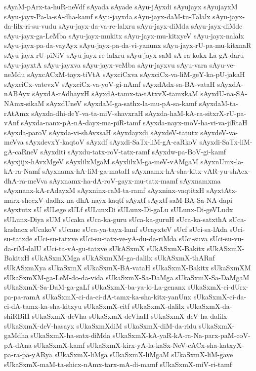 {sAyaM-pArx-ta-huR-neVdf
sAyada
sAyade
sAyu-jAyxdi
sAyujayx
sAyujayxM
sAyu-jayx-Pa-la-sA-dha-kamf
sAyu-jayxda
sAyu-jayx-daM-tu-Talalx
sAyu-jayx-da-lilx-ri-su-vudu
sAyu-jayx-da-va-re-lalxru
sAyu-jayx-diMda
sAyu-jayx-diMde
sAyu-jayx-ga-LeMba
sAyu-jayx-mukitx
sAyu-jayx-mu-kitxyeV
sAyu-jayx-nalalx
sAyu-jayx-pa-da-vayAyx
sAyu-jayx-pa-da-vi-yanunx
sAyu-jayx-rU-pa-mu-kitxnaR
sAyu-jayx-rU-piNiV
sAyu-jayx-re-lalxru
sAyu-jayx-saM-sA-ra-kokx-La-gA-daru
sAyu-jayxtA
sAyu-jayxva
sAyu-jayx-veMba
sAyu-jayxvu
sAyu-vara
sAyu-ve-neMdu
sAyxcACxM-tayx-tiVtA
sAyxciCxva
sAyxciCx-va-liM-geY-ka-pU-jakaH
sAyxciCx-vatevxV
sAyxciCx-va-yoV-gi-nAmf
sAyxdAdx-sa-BA-vataH
sAyxdA-nABAyx
sAyxdA-rAdhayxH
sAyxdA-tamx-ta-tAtxvX-tamxkaM
sAyxdU-na-SA-NAmx-sikaM
sAyxdUneV
sAyxdaM-ga-sathx-la-mu-pA-sa-kamf
sAyxdaM-ta-rAtAmx
sAyxda-dhi-deY-va-ta-miV-shavxraH
sAyxda-haM-kA-ra-sitxrX-rU-pa-vAnf
sAyxda-nanx-pA-nA-dayx-ma-piR-tamf
sAyxda-nayx-moV-ha-vi-va-jiRtaH
sAyxda-paroV
sAyxda-vi-shAvxsaH
sAyxdayxdi
sAyxdeV-tatutx
sAyxdeV-va-meVva
sAyxdevxY-kaqtoV
sAyxdf
sAyxdi-SaTx-liM-gA-caRkoV
sAyxdi-SaTx-liM-gA-caRneV
sAyxditi
sAyxdu-tatx-roV-tatx-ramf
sAyxdw-pa-BoV-gi-kamf
sAyxjijx-hAvxMgeV
sAyxlilxMgaM
sAyxlilxM-ga-meV-vAMgaM
sAyxnUmx-la-kA-ra-Namf
sAyxnamx-hA-liM-ga-mataH
sAyxnamx-hA-sha-kitx-vAR-yu-shAcx-dhA-ra-meVva
sAyxnamx-ha-dA-roV-gayx-mu-tatx-mamf
sAyxnamxma
sAyxnanx-kA-rAdayxM
sAyxninx-raM-ta-ramf
sAyxninx-vaqtitxH
sAyxtAtx-marx-shecxV-dadhx-na-dhA-nayx-kaqtf
sAyxtf
sAyxtf-saM-BA-Sa-NA-dapi
sAyxtutx
sU
sULege
sULf
sULunxDi
sULunx-Di-gaLu
sULunx-Di-geVLudx
sULunx-Diya
sUM
sUcaka
sUca-ka-guru
sUca-ka-guruH
sUca-ka-satxthA
sUca-kashacx
sUcakoV
sUcane
sUca-ya-tayx-lamf
sUcayxteV
sUcf
sUci-sa-lAda
sUci-su-tatxde
sUci-su-tatxve
sUci-su-tatx-ve-yA-du-da-riMda
sUci-suva
sUci-su-vu-da-riM-dalU
sUci-ta-vA-gu-tatxve
sUkASxmX
sUkASxmX-Bakitx
sUkASxmX-BakitxH
sUkASxmXMga
sUkASxmXM-ga-dalilx
sUkASxmX-thARnf
sUkASxmXya
sUkaSxmX
sUkaSxmX-BA-vataH
sUkaSxmX-Bakitx
sUkaSxmXM
sUkaSxmXM-ga-LeM-do-da-vida
sUkaSxmX-Sa-DaMga
sUkaSxmX-Sa-DaMgaM
sUkaSxmX-Sa-DaM-ga-gaLf
sUkaSxmX-ba-ya-lo-La-genanx
sUkaSxmX-ci-dUrx-pa-pa-ramA
sUkaSxmX-ci-da-ci-dA-tamx-ka-sha-kitx-yanUnx
sUkaSxmX-ci-da-ci-dA-tamx-ka-sha-kitxyu
sUkaSxmX-citf
sUkaSxmX-dalilx
sUkaSxmX-da-shiRBiH
sUkaSxmX-deVha
sUkaSxmX-deVhaH
sUkaSxmX-deV-ha-dalilx
sUkaSxmX-deV-hasayx
sUkaSxmXdiM
sUkaSxmX-diM-da-ridu
sUkaSxmX-gaMdha
sUkaSxmX-ha-satx-diMda
sUkaSxmX-kA-yaR-kA-ra-Na-parx-paM-coV-pA-dAna
sUkaSxmX-kamf
sUkaSxmX-kirx-yA-la-kaSx-NeV-cACx-sha-katxyX-pa-ra-pa-yARya
sUkaSxmX-liMga
sUkaSxmX-liMgaM
sUkaSxmX-liM-gave
sUkaSxmX-maM-ta-shicx-nAmx-tarx-mA-di-mamf
sUkaSxmX-miV-ri-tamf
}
